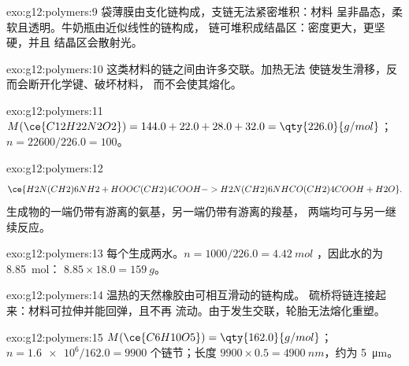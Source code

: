 \begin{solution}{exo:g12:polymers:9}
袋薄膜由支化链构成，支链无法紧密堆积：材料
呈非晶态，柔软且透明。牛奶瓶由近似线性的链构成，
链可堆积成结晶区：密度更大，更坚硬，并且
结晶区会散射光。
\end{solution}

\begin{solution}{exo:g12:polymers:10}
这类材料的链之间由许多交联。加热无法
使链发生滑移，反而会断开化学键、破坏材料，
而不会使其熔化。
\end{solution}

\begin{solution}{exo:g12:polymers:11}
$M(\ce{C12H22N2O2}) = 144.0 + 22.0 + 28.0 + 32.0 = \qty{226.0}{g/mol}$；
$n = 22600/226.0 = 100$。
\end{solution}

\begin{solution}{exo:g12:polymers:12}
\[
  \ce{H2N(CH2)6NH2 + HOOC(CH2)4COOH -> H2N(CH2)6NHCO(CH2)4COOH + H2O} .
\]
生成物的一端仍带有游离的氨基，另一端仍带有游离的羧基，
两端均可与另一继续反应。
\end{solution}

\begin{solution}{exo:g12:polymers:13}
每个生成两水。$n = 1000/226.0 =
\qty{4.42}{mol}$ ，因此水的为 \qty{8.85}{mol}：
$8.85 \times 18.0 = \qty{159}{g}$。
\end{solution}

\begin{solution}{exo:g12:polymers:14}
温热的天然橡胶由可相互滑动的链构成。
硫桥将链连接起来：材料可拉伸并能回弹，且不再
流动。由于发生交联，轮胎无法熔化重塑。
\end{solution}

\begin{solution}{exo:g12:polymers:15}
$M(\ce{C6H10O5}) = \qty{162.0}{g/mol}$；$n = \num{1.6e6}/162.0 = 9900$
个链节；长度 $9900 \times 0.5 = \qty{4900}{nm}$，约为
\qty{5}{\micro m}。
\end{solution}

